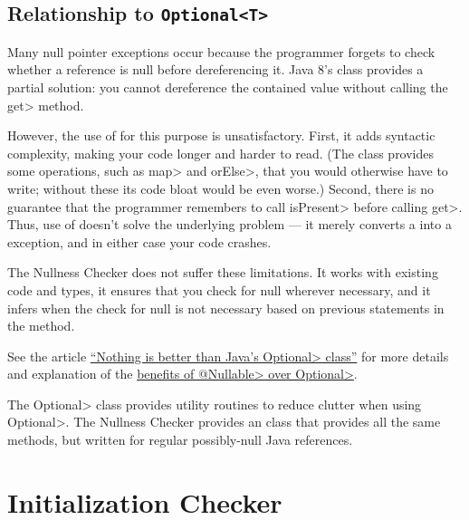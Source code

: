 \subsection{Relationship to \tt{Optional<T>}\label{nullness-vs-optional}}

Many null pointer exceptions occur because the programmer forgets to check
whether a reference is null before dereferencing it.  Java 8's
class provides a partial solution:  you cannot
dereference the contained value without calling the \<get> method.

However, the use of  for this purpose is unsatisfactory.
First, it adds syntactic complexity, making your code longer and harder to
read.  (The  class provides some operations, such as \<map>
and \<orElse>, that you would otherwise have to write; without these its
code bloat would be even worse.)  Second, there is no guarantee that the
programmer remembers to call \<isPresent> before calling \<get>.  Thus, use
of  doesn't solve the underlying problem --- it merely
converts a  into a
 exception, and in either case your code
crashes.

The Nullness Checker does not suffer these limitations.  It works with
existing code and types, it ensures that you check for null wherever
necessary, and it infers when the check for null is not necessary based on
previous statements in the method.

See the article
\href{http://homes.cs.washington.edu/~mernst/advice/nothing-is-better-than-optional.html}{``Nothing
  is better than Java's \<Optional> class''} for more details and
explanation of the
\href{http://homes.cs.washington.edu/~mernst/advice/nothing-is-better-than-optional.html#benefits-of-nullable}{benefits of \<@Nullable> over \<Optional>}.

The \<Optional> class provides utility routines to reduce clutter when
using \<Optional>.  The Nullness Checker provides an
 class that provides all the same methods,
but written for regular possibly-null Java references.


\section{Initialization Checker\label{initialization-checker}}

